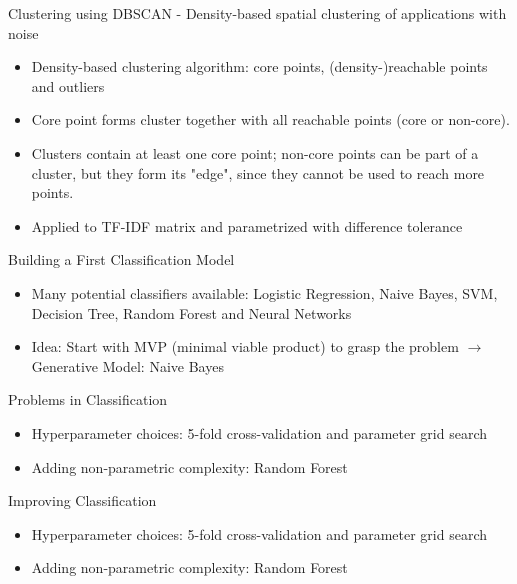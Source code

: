 \documentclass{beamer}
\begin{document}
\begin{frame}{Clustering using DBSCAN - Density-based spatial clustering of applications with noise}

\begin{itemize}
	\item Density-based clustering algorithm: core points, (density-)reachable points and outliers
	\item Core point forms cluster together with all reachable points (core or non-core).
	\item Clusters contain at least one core point; non-core points can be part of a cluster, but they form its "edge", since they cannot be used to reach more points.
	\item Applied to TF-IDF matrix and parametrized with difference tolerance 
\end{itemize}

\end{frame}

\begin{frame}{Building a First Classification Model}

\begin{itemize}
	\item Many potential classifiers available: Logistic Regression, Naive Bayes, SVM,
Decision Tree, Random Forest and Neural Networks
	\item Idea: Start with MVP (minimal viable product) to grasp the problem $\to$ Generative Model: Naive Bayes
\end{itemize}
\end{frame}

\begin{frame}{Problems in Classification}

\begin{itemize}
	\item Hyperparameter choices: 5-fold cross-validation and parameter grid search
	\item Adding non-parametric complexity: Random Forest
\end{itemize}

\end{frame}

\begin{frame}{Improving Classification}

\begin{itemize}
	\item Hyperparameter choices: 5-fold cross-validation and parameter grid search
	\item Adding non-parametric complexity: Random Forest
\end{itemize}

\end{frame}
\end{document}
